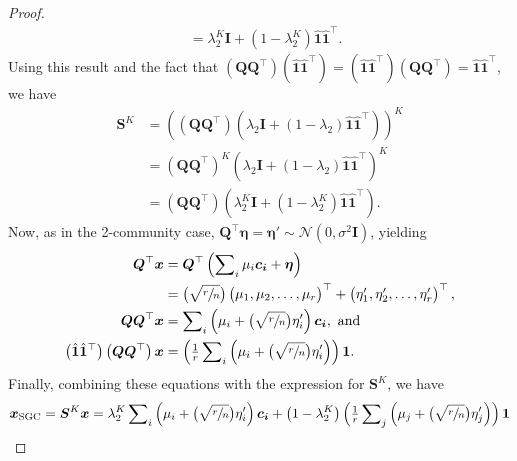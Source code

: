 \documentclass{article}
\begin{document}
\begin{proof}
\begin{align*}
    &= \lambda_2^K \bm{I}  + \left(1-\lambda_2^K\right) \hat{\bm{1}} \hat{\bm{1}}^\top.
\end{align*}
%
Using this result and the fact that $\left( \bm{Q}\bm{Q}^\top \right) \left( \hat{\bm{1}} \hat{\bm{1}}^\top \right) 
    = \left( \hat{\bm{1}} \hat{\bm{1}}^\top \right) \left( \bm{Q}\bm{Q}^\top \right) 
    = \hat{\bm{1}} \hat{\bm{1}}^\top$, we have
\begin{align}
    \bm{S}^K
    &= \left( \left( \bm{Q}\bm{Q}^\top \right) \left( \lambda_2 \bm{I}  + (1-\lambda_2) \hat{\bm{1}} \hat{\bm{1}}^\top \right) \right)^K \nonumber\\
    &= \left( \bm{Q}\bm{Q}^\top \right)^K \left( \lambda_2 \bm{I}  + (1-\lambda_2) \hat{\bm{1}} \hat{\bm{1}}^\top \right)^K \nonumber\\
    &= \left( \bm{Q}\bm{Q}^\top \right) \left( \lambda_2^K \bm{I}  + \left(1-\lambda_2^K\right) \hat{\bm{1}} \hat{\bm{1}}^\top \right) \label{eqn:multi_com_SK}.
\end{align}
%
Now, as in the 2-community case, $\bm{Q}^\top \bm{\eta} = \bm{\eta}' \sim \mathcal{N}(0, \sigma^2 \bm{I})$, yielding
%
\begin{align}
    \bm{Q}^\top \bm{x} &= \bm{Q}^\top \left( \sum\nolimits_i \mu_i \bm{c_i}  + \bm{\eta} \right) \nonumber \\
    &= \big( \sqrt{\sfrac{r}{n}} \big) \begin{pmatrix}
    \mu_1, \mu_2, \dots, \mu_r
    \end{pmatrix}^\top
    + \begin{pmatrix}
    \eta'_1, \eta'_2, \dots, \eta'_r
    \end{pmatrix}^\top, \nonumber\\
    \bm{Q} \bm{Q}^\top \bm{x} &= \sum\nolimits_i \left( \mu_i   + \big( \sqrt{\sfrac{r}{n}} \big) \eta'_i \right) \bm{c_i}, \text{ and} \label{eqn:multi_com_qproj} \\
    \left( \hat{\bm{1}} \hat{\bm{1}}^\top \right) \left( \bm{Q} \bm{Q}^\top \right) \bm{x} 
    &= \left( \tfrac{1}{r} \sum\nolimits_i \left( \mu_i   + \big( \sqrt{\sfrac{r}{n}} \big) \eta'_i \right) \right) \bm{1} \nonumber.
\end{align}
%
Finally, combining these equations with the expression for $\bm{S}^K$, we have
\begin{align*}
    \bm{x}_\text{SGC} = \bm{S}^K \bm{x}
    &= \lambda_2^K \sum\nolimits_i \left( \mu_i   + \big( \sqrt{\sfrac{r}{n}} \big) \eta'_i \right) \bm{c_i}
    + \left( 1 - \lambda_2^K \right) \left( \tfrac{1}{r} \sum\nolimits_j \left( \mu_j   + \big( \sqrt{\sfrac{r}{n}} \big) \eta'_j \right) \right) \bm{1} \\

\end{align*}
\end{proof}
\end{document}
